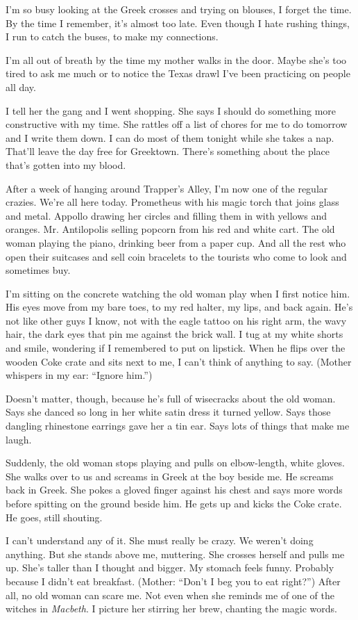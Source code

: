\documentclass[
]{article}
\begin{document}
I'm so busy looking at the Greek crosses and trying on blouses, I forget
the time. By the time I remember, it's almost too late. Even though I
hate rushing things, I run to catch the buses, to make my connections.

I'm all out of breath by the time my mother walks in the door. Maybe
she's too tired to ask me much or to notice the Texas drawl I've been
practicing on people all day.

I tell her the gang and I went shopping. She says I should do something
more constructive with my time. She rattles off a list of chores for me
to do tomorrow and I write them down. I can do most of them tonight
while she takes a nap. That'll leave the day free for Greektown. There's
something about the place that's gotten into my blood.

After a week of hanging around Trapper's Alley, I'm now one of the
regular crazies. We're all here today. Prometheus with his magic torch
that joins glass and metal. Appollo drawing her circles and filling them
in with yellows and oranges. Mr. Antilopolis selling popcorn from his
red and white cart. The old woman playing the piano, drinking beer from
a paper cup. And all the rest who open their suitcases and sell coin
bracelets to the tourists who come to look and sometimes buy.

I'm sitting on the concrete watching the old woman play when I first
notice him. His eyes move from my bare toes, to my red halter, my lips,
and back again. He's not like other guys I know, not with the eagle
tattoo on his right arm, the wavy hair, the dark eyes that pin me
against the brick wall. I tug at my white shorts and smile, wondering if
I remembered to put on lipstick. When he flips over the wooden Coke
crate and sits next to me, I can't think of anything to say. (Mother
whispers in my ear: ``Ignore him.'')

Doesn't matter, though, because he's full of wisecracks about the old
woman. Says she danced so long in her white satin dress it turned
yellow. Says those dangling rhinestone earrings gave her a tin ear. Says
lots of things that make me laugh.

Suddenly, the old woman stops playing and pulls on elbow-length, white
gloves. She walks over to us and screams in Greek at the boy beside me.
He screams back in Greek. She pokes a gloved finger against his chest
and says more words before spitting on the ground beside him. He gets up
and kicks the Coke crate. He goes, still shouting.

I can't understand any of it. She must really be crazy. We weren't doing
anything. But she stands above me, muttering. She crosses herself and
pulls me up. She's taller than I thought and big­ger. My stomach feels
funny. Probably because I didn't eat breakfast. (Mother: ``Don't I beg
you to eat right?'') After all, no old woman can scare me. Not even when
she reminds me of one of the witches in \emph{Macbeth}. I picture her
stirring her brew, chanting the magic words.
\end{document}
